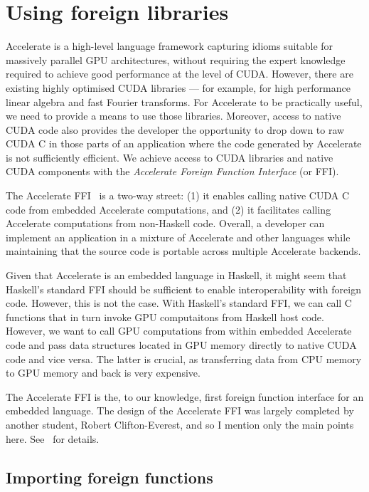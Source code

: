 \section{Using foreign libraries}

Accelerate is a high-level language framework capturing idioms suitable for
massively parallel GPU architectures, without requiring the expert knowledge
required to achieve good performance at the level of CUDA\@. However, there are
existing highly optimised CUDA libraries --- for example, for high performance
linear algebra and fast Fourier transforms. For Accelerate to be practically
useful, we need to provide a means to use those libraries. Moreover, access to
native CUDA code also provides the developer the opportunity to drop down to raw
CUDA C in those parts of an application where the code generated by Accelerate
is not sufficiently efficient. We achieve access to CUDA libraries and native
CUDA components with the \emph{Accelerate Foreign Function
Interface} (or FFI).

The Accelerate FFI~\cite{CliftonEverest:2014vi} is a two-way street: (1) it
enables calling native CUDA C code from embedded Accelerate computations, and
(2) it facilitates calling Accelerate computations from non-Haskell code.
Overall, a developer can implement an application in a mixture of Accelerate and
other languages while maintaining that the source code is portable across
multiple Accelerate backends.

Given that Accelerate is an embedded language in Haskell, it might seem that
Haskell's standard FFI should be sufficient to enable interoperability
with foreign code. However, this is not the case. With Haskell's standard FFI,
we can call C functions that in turn invoke GPU computaitons from Haskell host
code. However, we want to call GPU computations from within embedded Accelerate
code and pass data structures located in GPU memory directly to native CUDA code
and vice versa. The latter is crucial, as transferring data from CPU memory to
GPU memory and back is very expensive.

The Accelerate FFI is the, to our knowledge, first foreign function interface
for an embedded language. The design of the Accelerate FFI was largely
completed by another student, Robert Clifton-Everest, and so I mention only the
main points here. See~\cite{CliftonEverest:2014vi} for details.

\subsection{Importing foreign functions}

